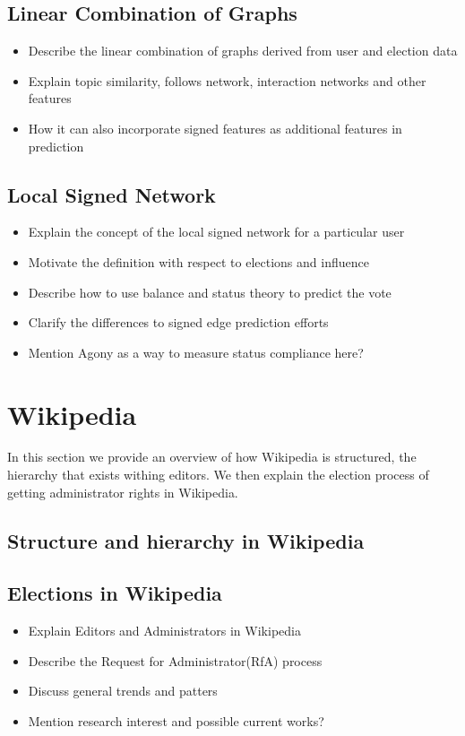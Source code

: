 \section{Linear Combination of Graphs}
\begin{itemize}
    \item Describe the linear combination of graphs derived from user and election data
    \item Explain topic similarity, follows network, interaction networks and other features
    \item How it can also incorporate signed features as additional features in prediction
\end{itemize}
\section{Local Signed Network}
\begin{itemize}
    \item Explain the concept of the local signed network for a particular user
    \item Motivate the definition with respect to elections and influence
    \item Describe how to use balance and status theory to predict the vote
    \item Clarify the differences to signed edge prediction efforts
    \item Mention Agony as a way to measure status compliance here?
\end{itemize}

\chapter{Wikipedia}
In this section we provide an overview of how Wikipedia is structured, the hierarchy that exists withing editors. We then explain the election process of getting administrator rights in Wikipedia.

\section{Structure and hierarchy in Wikipedia}
\section{Elections in Wikipedia}
\begin{itemize}
    \item Explain Editors and Administrators in Wikipedia
    \item Describe the Request for Administrator(RfA) process
    \item Discuss general trends and patters
    \item Mention research interest and possible current works?
\end{itemize}


